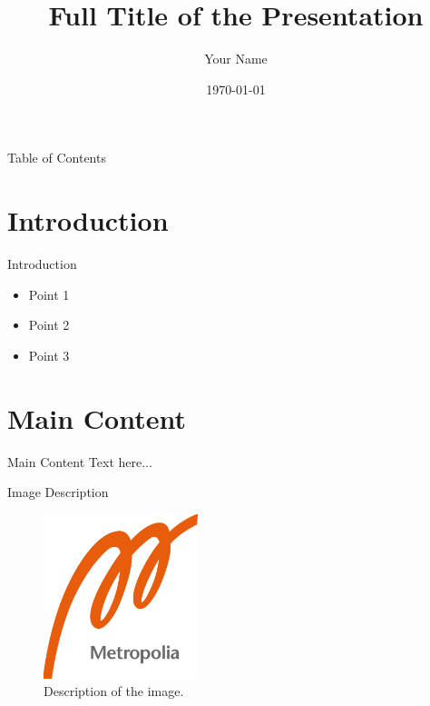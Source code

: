 \documentclass{beamer}
\title[Short Title]{Full Title of the Presentation}
\author{Your Name}
\institute[Metropolia UAS]{Metropolia University of Applied Sciences}
\date{\today}
\begin{document}
\begin{frame}
  \titlepage
\end{frame}

\begin{frame}{Table of Contents}
  \tableofcontents
\end{frame}

\section{Introduction}
\begin{frame}{Introduction}
  \begin{itemize}
    \item Point 1
    \item Point 2
    \item Point 3
  \end{itemize}
\end{frame}

\section{Main Content}
\begin{frame}{Main Content}
  Text here...
\end{frame}

\begin{frame}{Image Description}
    \begin{figure}
        \centering
        \includegraphics[width=0.4\textwidth]{logo.png} %
        \caption{Description of the image.}
    \end{figure}
\end{frame}
\end{document}

